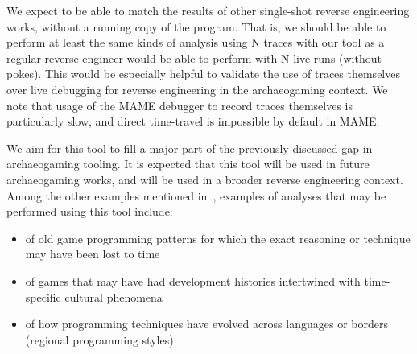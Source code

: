 \documentclass[manuscript,anonymous,review,authorversion=true,nonacm=true,screen]{acmart}
\begin{document}
We expect to be able to match the results of other single-shot reverse engineering works, without a running copy of the program.
That is, we should be able to perform at least the same kinds of analysis using N traces with our tool as a regular reverse engineer would be able to perform with N live runs (without pokes).
This would be especially helpful to validate the use of traces themselves over live debugging for reverse engineering in the archaeogaming context.
We note that usage of the MAME debugger to record traces themselves is particularly slow, and direct time-travel is impossible by default in MAME\@.

We aim for this tool to fill a major part of the previously-discussed gap in archaeogaming tooling.
It is expected that this tool will be used in future archaeogaming works, and will be used in a broader reverse engineering context.
Among the other examples mentioned in~\cite{reinhard2018archaeogaming}, examples of analyses that may be performed using this tool include:
\begin{itemize}
    \item of old game programming patterns for which the exact reasoning or technique may have been lost to time
    \item of games that may have had development histories intertwined with time-specific cultural phenomena
    \item of how programming techniques have evolved across languages or borders (regional programming styles)
\end{itemize}


\ifcurrfileabsdir{}{

}{

}
\end{document}
